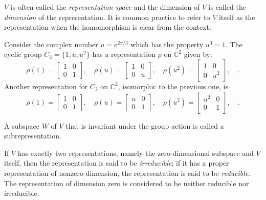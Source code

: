$V$ is often called the \textit{representation space} and the dimension of $V$
is called the \textit{dimension} of the representation. It is common practice
to refer to $V$ itself as the representation when the homomorphism is clear
from the context.

\begin{example}
  Consider the complex number $u = e^{2\pi/3}$ which has the property $u^3=1$.
  The cyclic group $C_3 = \{1,u,u^2\}$ has a representation $\rho$ on
  $\mathbb{C}^2$ given by:
  \begin{equation}
    \rho(1) = \begin{bmatrix} 1 & 0\\ 0 & 1\end{bmatrix},\quad 
    \rho(u) = \begin{bmatrix} 1 & 0\\ 0 & u\end{bmatrix},\quad
    \rho(u^2) = \begin{bmatrix} 1 & 0\\ 0 & u^2\end{bmatrix},\quad.
  \end{equation}
Another representation for $C_3$ on $\mathbb{C}^2$, isomorphic to the previous
one, is
  \begin{equation}
    \rho(1) = \begin{bmatrix} 1 & 0\\ 0 & 1\end{bmatrix},\quad 
    \rho(u) = \begin{bmatrix} u & 0\\ 0 & 1\end{bmatrix},\quad
    \rho(u^2) = \begin{bmatrix} u^2 & 0\\ 0 & 1\end{bmatrix},\quad.
  \end{equation}
\end{example}

\begin{definition}[Subrepresentation]
  A subspace $W$ of $V$ that is invariant under the group action is called
  a subrepresentation.
\end{definition}

\begin{definition}
  If $V$ has exactly two representations, namely the zero-dimensional subspace
  and $V$ itself, then the representation is said to be \textit{irreducible};
  if it has a proper representation of nonzero dimension, the representation is
  said to be \textit{reducible}. The representation of dimension zero is
  considered to be neither reducible nor irreducible.
\end{definition}

